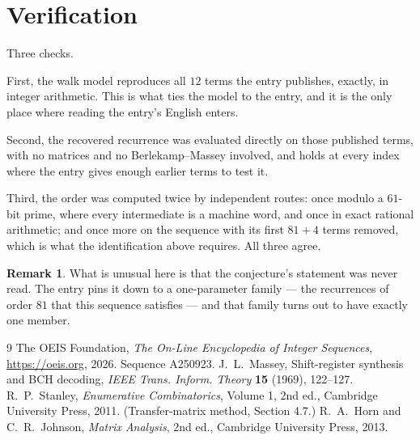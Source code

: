 \documentclass[11pt,a4paper]{article}
\theoremstyle{plain}
\theoremstyle{definition}
\newtheorem{remark}[theorem]{Remark}
\begin{document}
\section{Verification}

Three checks.

First, the walk model reproduces all $12$ terms the entry publishes, exactly, in integer
arithmetic. This is what ties the model to the entry, and it is the only place where reading
the entry's English enters.

Second, the recovered recurrence was evaluated directly on those published terms, with no
matrices and no Berlekamp--Massey involved, and holds at every index where the entry gives
enough earlier terms to test it.

Third, the order was computed twice by independent routes: once modulo a $61$-bit prime, where
every intermediate is a machine word, and once in exact rational arithmetic; and once more on
the sequence with its first $81+4$ terms removed, which is what the identification above
requires. All three agree.

\begin{remark}
What is unusual here is that the conjecture's statement was never read. The entry pins it down
to a one-parameter family --- the recurrences of order $81$ that this sequence satisfies
--- and that family turns out to have exactly one member.
\end{remark}

\begin{thebibliography}{9}
 The OEIS Foundation, \emph{The On-Line Encyclopedia of Integer
Sequences}, \url{https://oeis.org}, 2026. Sequence A250923.
 J.~L.~Massey, Shift-register synthesis and BCH decoding, \emph{IEEE
Trans. Inform. Theory} \textbf{15} (1969), 122--127.
 R.~P.~Stanley, \emph{Enumerative Combinatorics}, Volume 1, 2nd ed.,
Cambridge University Press, 2011. (Transfer-matrix method, Section 4.7.)
 R.~A.~Horn and C.~R.~Johnson, \emph{Matrix Analysis}, 2nd ed., Cambridge
University Press, 2013.
\end{thebibliography}
\end{document}

